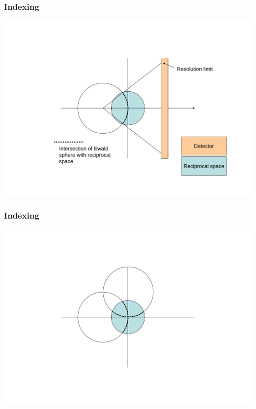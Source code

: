 \documentclass[slides,compress]{beamer}
\begin{document}
\begin{frame}
\frametitle{Indexing}
\hspace{6cm}
\includegraphics[scale=0.5]{figures/EwaldExplain.pdf}
\end{frame}

\begin{frame}
\frametitle{Indexing}
\hspace{6cm}
\includegraphics[scale=0.5]{figures/Ewald2Image.pdf}
\end{frame}
\end{document}
